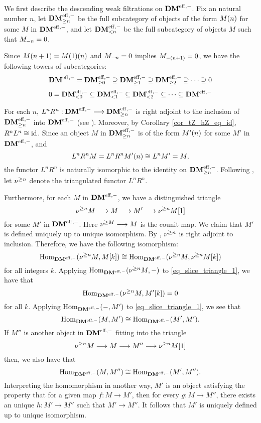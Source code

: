 We first describe the descending weak filtrations on $\DMeff$. Fix
an natural number $n$, let $\GFiltDM[n]{\DMeff}$ be the full 
subcategory of objects of the form $\tZ[n]{M}$ for some $M$ in 
$\DMeff$, and let $\LFiltDM[n]{\DMeff}$ be the full subcategory of 
objects $M$ such that $\hZ[n]{M} = 0$.

Since $\tZ[n + 1]{M} = \tZ[n]{\tZ[1]{M}}$ and $\hZ[n]{M} = 0$ 
implies $\hZ[(n + 1)]{M} = 0$, we have the following towers of 
subcategories:
\begin{equation}\label{eq_gslice_tower_DMeff}
\DMeff = \GFiltDM[0]{\DMeff} \supseteq \GFiltDM[1]{\DMeff} 
   \supseteq \GFiltDM[2]{\DMeff} \supseteq \cdots \supseteq 0
\end{equation}
\begin{equation}\label{eq_lslice_tower_DMeff}
0 = \LFiltDM[0]{\DMeff} \subseteq \LFiltDM[1]{\DMeff} \subseteq 
   \LFiltDM[2]{\DMeff} \subseteq \cdots \subseteq \DMeff
\end{equation}

For each $n$, $L^n R^n : \DMeff \to \GFiltDM[n]{\DMeff}$ is right
adjoint to the inclusion of $\GFiltDM[n]{\DMeff}$ into $\DMeff$
(see \cite[1.1]{HuKa}). Moreover, by Corollary 
\ref{cor_tZ_hZ_eq_id}, $R^nL^n \cong \id$. Since an object $M$ in 
$\GFiltDM[n]{\DMeff}$ is of the form $\tZ[n]{M'}$ for some $M'$ in 
$\DMeff$, and
\[
L^nR^n M = L^nR^n \tZ[n]{M'} \cong L^n M' = M,
\]
the functor $L^nR^n$ is naturally isomorphic to the identity on
$\GFiltDM[n]{\DMeff}$. Following \cite{HuKa}, let $\sgDM{n}$
denote the triangulated functor $L^nR^n$.

Furthermore, for each $M$ in $\DMeff$, we have a distinguished 
triangle
\begin{equation}\label{eq_slice_triangle_1}
\sgDM{n}M \to M \to M' \to \sgDM{n}M[1]
\end{equation}
for some $M'$ in $\DMeff$. Here $\sgDM{M} \to M$ is the 
counit map. We claim that $M'$ is defined uniquely up to unique
isomorphism. By \cite[1.1]{HuKa}, $\sgDM{n}$ is right adjoint to 
inclusion. Therefore, we have the following isomorphism:
\[
\homDMf(\sgDM{n}M, M[k]) \cong \homDMf(\sgDM{n}M, \sgDM{n}M[k])
\]
for all integers $k$. Applying $\homDMf(\sgDM{n}M, -)$ to 
\eqref{eq_slice_triangle_1}, we have that
\[
\homDMf(\sgDM{n}M, M'[k]) = 0
\]
for all $k$. Applying $\homDMf(-,M')$ to 
\eqref{eq_slice_triangle_1}, we see that 
\[
\homDMf(M, M') \cong \homDMf(M', M').
\]
If $M''$ is another object in $\DMeff$ fitting into the triangle
\[
\sgDM{n}M \to M \to M'' \to \sgDM{n}M[1]
\]
then, we also have that
\[
\homDMf(M, M'') \cong \homDMf(M',M'').
\]
Interpreting the homomorphism in another way, $M'$ is an object
satisfying the property that for a given map $f: M \to M'$, then
for every $g: M \to M''$, there exists an unique $h: M' \to M''$ 
such that $M' \to M''$. It follows that $M'$ is uniquely defined 
up to unique isomorphism.

